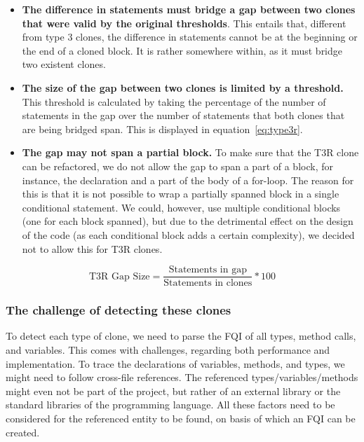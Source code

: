 \documentclass[a4paper]{article}
\begin{document}
\begin{itemize}
  \item \textbf{The difference in statements must bridge a gap between two clones that were valid by the original thresholds}. This entails that, different from type 3 clones, the difference in statements cannot be at the beginning or the end of a cloned block. It is rather somewhere within, as it must bridge two existent clones.
  \item \textbf{The size of the gap between two clones is limited by a threshold.} This threshold is calculated by taking the percentage of the number of statements in the gap over the number of statements that both clones that are being bridged span. This is displayed in equation~\ref{eq:type3r}.
  \item \textbf{The gap may not span a partial block.} To make sure that the T3R clone can be refactored, we do not allow the gap to span a part of a block, for instance, the declaration and a part of the body of a for-loop. The reason for this is that it is not possible to wrap a partially spanned block in a single conditional statement. We could, however, use multiple conditional blocks (one for each block spanned), but due to the detrimental effect on the design of the code (as each conditional block adds a certain complexity), we decided not to allow this for T3R clones.
\end{itemize}

\begin{equation}\label{eq:type3r}
\text{T3R Gap Size}=\frac{\text{Statements in gap}}{\text{Statements in clones}}*100
\end{equation}

\subsubsection{The challenge of detecting these clones}\label{chap:challenge}
To detect each type of clone, we need to parse the FQI of all types, method calls, and variables. This comes with challenges, regarding both performance and implementation. To trace the declarations of variables, methods, and types, we might need to follow cross-file references. The referenced types/variables/methods might even not be part of the project, but rather of an external library or the standard libraries of the programming language. All these factors need to be considered for the referenced entity to be found, on basis of which an FQI can be created.
\end{document}
